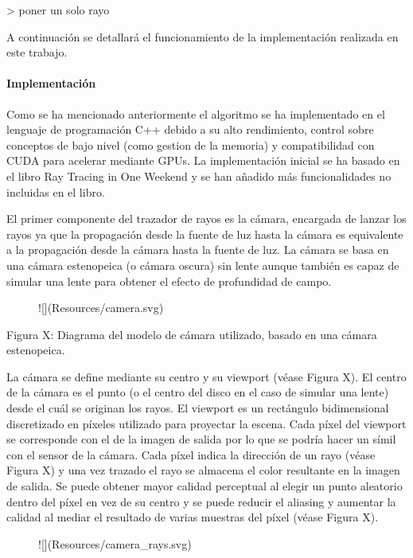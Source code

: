 \documentclass[10pt, a4paper]{article}
\begin{document}
> poner un solo rayo

A continuación se detallará el funcionamiento de la implementación realizada en este trabajo.

\paragraph{Implementación}

Como se ha mencionado anteriormente el algoritmo se ha implementado en el lenguaje de programación C++ debido a su alto rendimiento, control sobre conceptos de bajo nivel (como gestion de la memoria) y compatibilidad con CUDA para acelerar mediante GPUs. La implementación inicial se ha basado en el libro Ray Tracing in One Weekend \cite{Shirley:2024} y se han añadido más funcionalidades no incluidas en el libro.

El primer componente del trazador de rayos es la cámara, encargada de lanzar los rayos ya que la propagación desde la fuente de luz hasta la cámara es equivalente a la propagación desde la cámara hasta la fuente de luz. La cámara se basa en una cámara estenopeica (o cámara oscura) sin lente aunque también es capaz de simular una lente para obtener el efecto de profundidad de campo.

\begin{figure}[h] 
![](Resources/camera.svg)
\end{figure}

Figura X: Diagrama del modelo de cámara utilizado, basado en una cámara estenopeica.

La cámara se define mediante su centro y su viewport (véase Figura X). El centro de la cámara es el punto (o el centro del disco en el caso de simular una lente) desde el cuál se originan los rayos. El viewport es un rectángulo bidimensional discretizado en píxeles utilizado para proyectar la escena. Cada píxel del viewport se corresponde con el de la imagen de salida por lo que se podría hacer un símil con el sensor de la cámara. Cada píxel indica la dirección de un rayo (véase Figura X) y una vez trazado el rayo se almacena el color resultante en la imagen de salida. Se puede obtener mayor calidad perceptual al elegir un punto aleatorio dentro del píxel en vez de su centro y se puede reducir el aliasing y aumentar la calidad al mediar el resultado de varias muestras del píxel (véase Figura X).

\begin{figure}[h] 
![](Resources/camera_rays.svg)
\end{figure}
\end{document}
